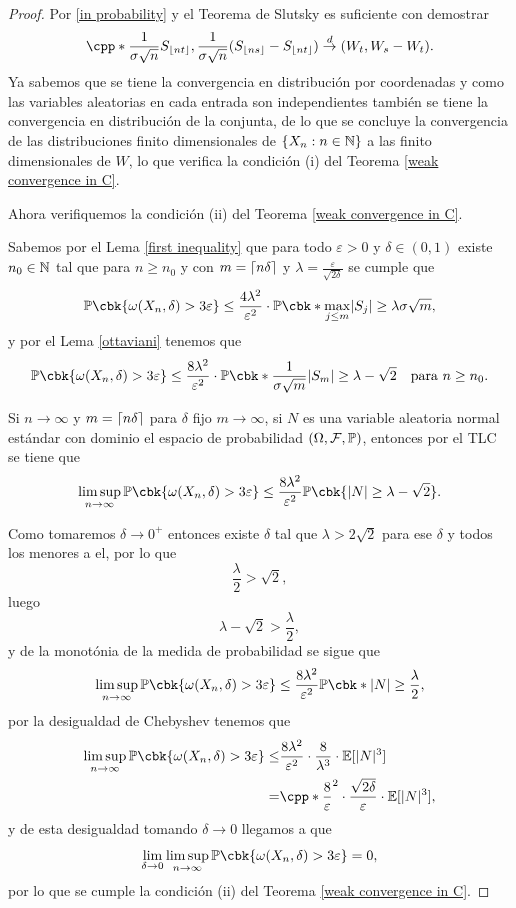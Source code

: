 \documentclass[12pt, letterpaper]{article}
\numberwithin{equation}{section}
\begin{document}
\begin{proof}
    Por \eqref{in probability} y el Teorema de Slutsky es suficiente con demostrar 
    \[
        \cpp*{\frac{1}{\sigma\sqrt{n}}S_{\floor{nt}},\frac{1}{\sigma\sqrt{n}}(S_{\floor{ns}}-S_{\floor{nt}})}\ar{d} (W_t,W_s-W_t).
    \]
    Ya sabemos que se tiene la convergencia en distribución por coordenadas y como las variables aleatorias en cada entrada son independientes también se tiene la convergencia en distribución de la conjunta, de lo que se concluye la convergencia de las distribuciones finito dimensionales de $\{X_n:n\in\N\}$ a las finito dimensionales de $W$, lo que verifica la condición (i) del Teorema \ref{weak convergence in C}.

    Ahora verifiquemos la condición (ii) del Teorema \ref{weak convergence in C}. 

    Sabemos por el Lema \ref{first inequality} que para todo $\varepsilon>0$ y $\delta\in (0,1)$ existe $n_0\in\N$ tal que para $n\geq n_0$ y con $m=\lceil n\delta\rceil$ y $\lambda=\frac{\varepsilon}{\sqrt{2\delta}}$ se cumple que
    \[
        \PP\cbk{\omega(X_n,\delta)>3\varepsilon}\leq \frac{4\lambda^2}{\varepsilon^2}\cdot\PP\cbk*{\max_{j\leq m}\abs{S_j}\geq\lambda\sigma\sqrt{m}},  
    \]
    y por el Lema \ref{ottaviani} tenemos que 
    \[
        \PP\cbk{\omega(X_n,\delta)>3\varepsilon}\leq \frac{8\lambda^2}{\varepsilon^2}\cdot \PP\cbk*{\frac{1}{\sigma\sqrt{m}}\abs{S_m}\geq \lambda-\sqrt{2}}\ \ \text{ para }n\geq n_0.
    \]

    Si $n\to\infty$ y $m=\lceil n\delta\rceil$ para $\delta$ fijo $m\to\infty$, si $N$ es una variable aleatoria normal estándar con dominio el espacio de probabilidad $\ofp$, entonces por el TLC se tiene que 
    \[
    \limsup_{n\to\infty}\PP\cbk{\omega(X_n,\delta)>3\varepsilon}\leq\frac{8\lambda^2}{\varepsilon^2}\PP\cbk{\abs{N}\geq\lambda-\sqrt{2}}.    
    \]
    
    Como tomaremos $\delta\to 0^+$ entonces existe $\delta$ tal que $\lambda>2\sqrt{2}$ para ese $\delta$ y todos los menores a el, por lo que 
    \[
        \frac{\lambda}{2}>\sqrt{2},
    \]
    luego 
    \[
        \lambda-\sqrt{2}>\frac{\lambda}{2},
    \]
    y de la monotónia de la medida de probabilidad se sigue que 
    \[
        \limsup_{n\to\infty}\PP\cbk{\omega(X_n,\delta)>3\varepsilon}\leq\frac{8\lambda^2}{\varepsilon^2}\PP\cbk*{\abs{N}\geq\frac{\lambda}{2}},
    \]
    por la desigualdad de Chebyshev tenemos que 
    \begin{align*}
        \limsup_{n\to\infty}\PP\cbk{\omega(X_n,\delta)>3\varepsilon}\leq& \frac{8\lambda^2}{\varepsilon^2}\cdot \frac{8}{\lambda^3}\cdot \EE[\abs{N}^3]\\ 
        =&\cpp*{\frac{8}{\varepsilon}}^2\cdot\frac{\sqrt{2\delta}}{\varepsilon}\cdot\EE[\abs{N}^3],
    \end{align*}
    y de esta desigualdad tomando $\delta\to 0$ llegamos a que
    \[
    \lim_{\delta\to 0}\limsup_{n\to\infty}\PP\cbk{\omega(X_n,\delta)>3\varepsilon}=0,
    \]
    por lo que se cumple la condición (ii) del Teorema \ref{weak convergence in C}.


\end{proof}
\end{document}
